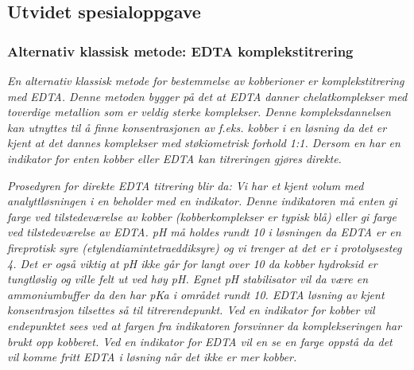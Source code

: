 

\subsection{Utvidet spesialoppgave}

\subsubsection{Alternativ klassisk metode: EDTA komplekstitrering}
\textit{En alternativ klassisk metode for bestemmelse av kobberioner er komplekstitrering med EDTA\cite{EDTACopper2}. Denne metoden bygger på det at EDTA danner chelatkomplekser med toverdige metallion som er veldig sterke komplekser. Denne kompleksdannelsen kan utnyttes til å finne konsentrasjonen av f.eks. kobber i en løsning da det er kjent at det dannes komplekser med støkiometrisk forhold 1:1. Dersom en har en indikator for enten kobber eller EDTA kan titreringen gjøres direkte\cite{EDTACopper}.}

\textit{Prosedyren for direkte EDTA titrering blir da: Vi har et kjent volum med analyttløsningen i en beholder med en indikator. Denne indikatoren må enten gi farge ved tilstedeværelse av kobber (kobberkomplekser er typisk blå) eller gi farge ved tilstedeværelse av EDTA. pH må holdes rundt 10 i løsningen da EDTA er en fireprotisk syre (etylendiamintetraeddiksyre) og vi trenger at det er i protolysesteg 4. Det er også viktig at pH ikke går for langt over 10 da kobber hydroksid er tungtløslig og ville felt ut ved høy pH. Egnet pH stabilisator vil da være en ammoniumbuffer da den har pKa i området rundt 10. EDTA løsning av kjent konsentrasjon tilsettes så til titrerendepunkt. Ved en indikator for kobber vil endepunktet sees ved at fargen fra indikatoren forsvinner da komplekseringen har brukt opp kobberet. Ved en indikator for EDTA vil en se en farge oppstå da det vil komme fritt EDTA i løsning når det ikke er mer kobber.}

